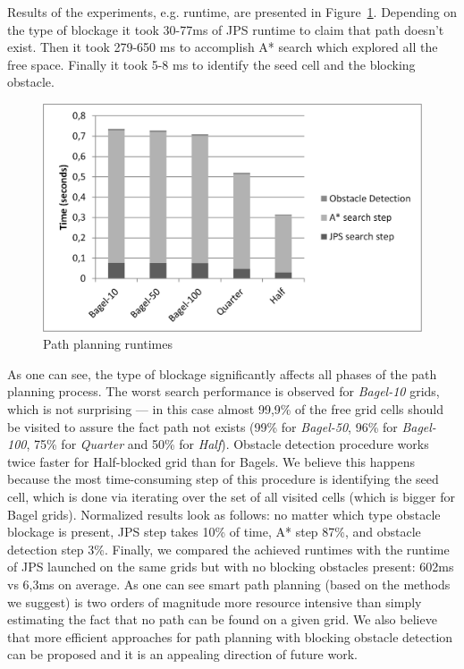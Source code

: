 \documentclass[procedia]{easychair}
\begin{document}
Results of the experiments, e.g. runtime, are presented in Figure~\ref{fig:path_exper}. Depending on the type of blockage it took 30-77ms of JPS runtime to claim that path doesn't exist. Then it took 279-650 ms to accomplish A* search which explored all the free space. Finally it took 5-8 ms to identify the seed cell and the blocking obstacle. 

\begin{figure}[tb]
	\begin{centering}
		\includegraphics[width=\textwidth]{bica_path_plan}
		\caption{Path planning runtimes}
		\label{fig:path_exper}
	\end{centering}
\end{figure}

As one can see, the type of blockage significantly affects all phases of the path planning process. The worst search performance is observed for \textit{Bagel-10} grids, which is not surprising --- in this case almost 99,9\% of the free grid cells should be visited to assure the fact path not exists (99\% for \textit{Bagel-50}, 96\% for \textit{Bagel-100}, 75\% for \textit{Quarter} and 50\% for \textit{Half}). Obstacle detection procedure works twice faster for Half-blocked grid than for Bagels. We believe this happens because the most time-consuming step of this procedure is identifying the seed cell, which is done via iterating over the set of all visited cells (which is bigger for Bagel grids). Normalized results look as follows: no matter which type obstacle blockage is present, JPS step takes 10\% of time, A* step 87\%, and obstacle detection step 3\%. Finally, we compared the achieved runtimes with the runtime of JPS launched on the same grids but with no blocking obstacles present: 602ms vs 6,3ms on average. As one can see smart path planning (based on the methods we suggest) is two orders of magnitude more resource intensive than simply estimating the fact that no path can be found on a given grid. We also believe that more efficient approaches for path planning with blocking obstacle detection can be proposed and it is an appealing direction of future work.
\end{document}
